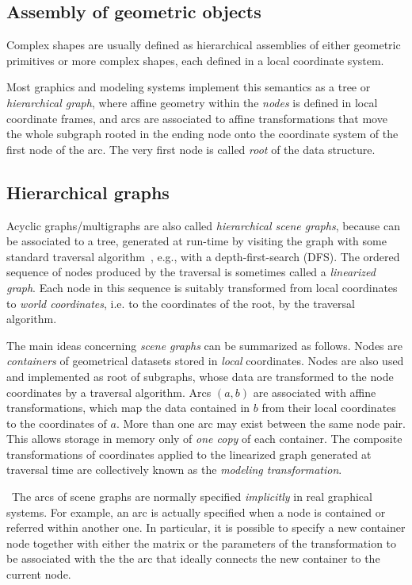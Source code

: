 \begin{coding}
\section{Assembly of geometric objects}\label{sect:4-3}

Complex shapes are usually defined as hierarchical assemblies of either geometric primitives or more  complex shapes, each defined in a local coordinate system. 

Most graphics and modeling systems implement this semantics as a tree or \emph{hierarchical graph}, where affine geometry within the \emph{nodes} is defined in local coordinate frames, and arcs are associated to affine transformations that move the whole subgraph rooted in the ending node onto the coordinate system of the first node of the arc. The very first node is called \emph{root} of the data structure.


\subsection{Hierarchical graphs}

Acyclic graphs/multigraphs are also called \emph{hierarchical scene graphs}, because can be associated to a tree, generated at run-time by visiting the graph with some standard traversal algorithm~\cite{10.5555/1614191}, e.g., with a depth-first-search (DFS).  The ordered sequence of nodes produced by the traversal is sometimes called a \emph{linearized graph}.  Each node in this sequence is suitably transformed from local coordinates to \emph{world coordinates}, i.e. to the coordinates of the root, by the traversal algorithm.

The main ideas concerning \emph{scene graphs} can be summarized as
follows.
Nodes are  \emph{containers} of geometrical datasets stored in
\emph{local} coordinates.  Nodes are also used and implemented as root of subgraphs, 
whose data are transformed to the node coordinates by a traversal
algorithm.
Arcs $(a,b)$ are associated with affine transformations, which map the
data contained in $b$ from their local coordinates to the coordinates
of $a$.  More than one arc may exist between the same node pair.  This
allows storage in memory only of \emph{one copy} of each container.
The composite transformations of coordinates applied to the linearized
graph generated at traversal time are collectively known as the
\emph{modeling transformation}.

\begin{remark}\ 
The arcs of scene graphs are normally specified \emph{implicitly}
in real graphical systems.  For example, an arc is actually specified
when a node is contained or referred within another one. In particular, 
it is possible to specify a new container node together with either the 
matrix or the parameters of the transformation to be associated with the 
the arc that ideally connects the new container to the current node.
\end{remark}


\end{coding}
